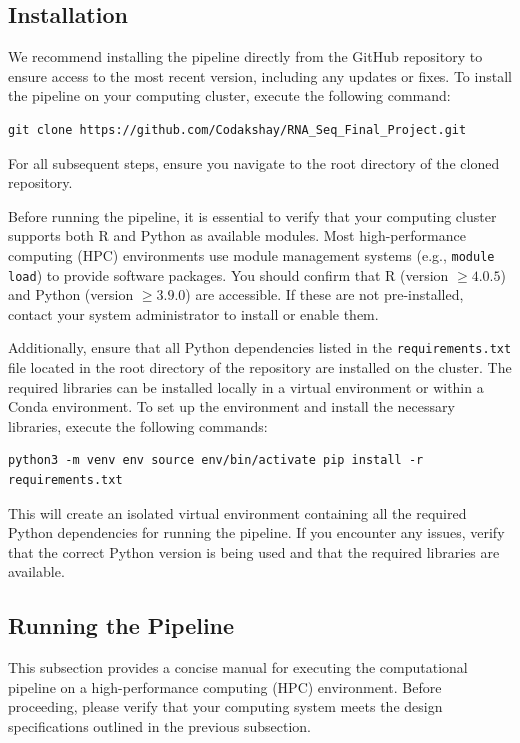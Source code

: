 \documentclass{article}
\begin{document}
\subsection{Installation}
We recommend installing the pipeline directly from the GitHub repository to ensure access to the most recent version, including any updates or fixes. To install the pipeline on your computing cluster, execute the following command:

\begin{verbatim}
git clone https://github.com/Codakshay/RNA_Seq_Final_Project.git
\end{verbatim}
For all subsequent steps, ensure you navigate to the root directory of the cloned repository.

Before running the pipeline, it is essential to verify that your computing cluster supports both R and Python as available modules. Most high-performance computing (HPC) environments use module management systems (e.g., \texttt{module load}) to provide software packages. You should confirm that R (version $\geq 4.0.5$) and Python (version $\geq 3.9.0$) are accessible. If these are not pre-installed, contact your system administrator to install or enable them.

Additionally, ensure that all Python dependencies listed in the \texttt{requirements.txt} file located in the root directory of the repository are installed on the cluster. The required libraries can be installed locally in a virtual environment or within a Conda environment. To set up the environment and install the necessary libraries, execute the following commands:
\begin{verbatim}
python3 -m venv env source env/bin/activate pip install -r requirements.txt
\end{verbatim}
This will create an isolated virtual environment containing all the required Python dependencies for running the pipeline. If you encounter any issues, verify that the correct Python version is being used and that the required libraries are available.

\subsection{Running the Pipeline}
This subsection provides a concise manual for executing the computational pipeline on a high-performance computing (HPC) environment. Before proceeding, please verify that your computing system meets the design specifications outlined in the previous subsection.
\end{document}

